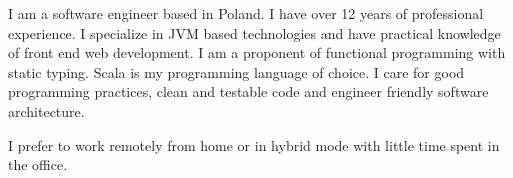 \documentclass[8pt]{developercv} %
\begin{document}
\vspace{0.5cm}



\begin{minipage}[t]{0.45\textwidth} %
	\vspace{-\baselineskip} %
	
	I am a software engineer based in Poland. I have over 12 years of professional experience. I specialize in JVM based technologies and have practical knowledge of front end web development. I am a proponent of functional programming with static typing. Scala is my programming language of choice. I care for good programming practices, clean and testable code and engineer friendly software architecture.

    I prefer to work remotely from home or in hybrid mode with little time spent in the office.
\end{minipage}
\hfill %
\begin{minipage}[t]{0.5\textwidth} %
	\vspace{-\baselineskip} %
	\begin{barchart}{5.5}
	\end{barchart}
\end{minipage}

\begin{center}
\end{center}


\end{document}

